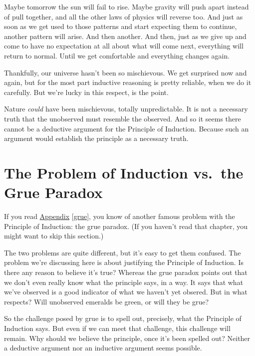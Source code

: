 \documentclass[justified]{tufte-book}
\theoremstyle{definition}
\theoremstyle{definition}
\theoremstyle{definition}
\theoremstyle{definition}
\theoremstyle{remark}
\begin{document}
Maybe tomorrow the sun will fail to rise. Maybe gravity will push apart instead of pull together, and all the other laws of physics will reverse too. And just as soon as we get used to those patterns and start expecting them to continue, another pattern will arise. And then another. And then, just as we give up and come to have no expectation at all about what will come next, everything will return to normal. Until we get comfortable and everything changes again.

Thankfully, our universe hasn't been so mischievous. We get surprised now and again, but for the most part inductive reasoning is pretty reliable, when we do it carefully. But we're lucky in this respect, is the point.

Nature \emph{could} have been mischievous, totally unpredictable. It is not a necessary truth that the unobserved must resemble the observed. And so it seems there cannot be a deductive argument for the Principle of Induction. Because such an argument would establish the principle as a necessary truth.

\hypertarget{the-problem-of-induction-vs.-the-grue-paradox}{%
\section*{The Problem of Induction vs.~the Grue Paradox}\label{the-problem-of-induction-vs.-the-grue-paradox}}

If you read \protect\hyperlink{grue}{Appendix} \ref{grue}, you know of another famous problem with the Principle of Induction: the grue paradox. (If you haven't read that chapter, you might want to skip this section.)

The two problems are quite different, but it's easy to get them confused. The problem we're discussing here is about justifying the Principle of Induction. Is there any reason to believe it's true? Whereas the grue paradox points out that we don't even really know what the principle says, in a way. It says that what we've observed is a good indicator of what we haven't yet obsered. But in what respects? Will unobserved emeralds be green, or will they be grue?

So the challenge posed by grue is to spell out, precisely, what the Principle of Induction says. But even if we can meet that challenge, this challenge will remain. Why should we believe the principle, once it's been spelled out? Neither a deductive argument nor an inductive argument seems possible.
\end{document}
